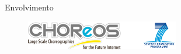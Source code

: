 \documentclass[xcolor=svgnames]{beamer}
\begin{document}






    \begin{frame}{Envolvimento}
      \begin{figure}[!h]
          \centering
          \includegraphics[width=0.6\textwidth]{./figures/CHOReOSProject.png}
      \end{figure}	
    \end{frame}

 \begin{frame}
 \end{frame}
\end{document}
